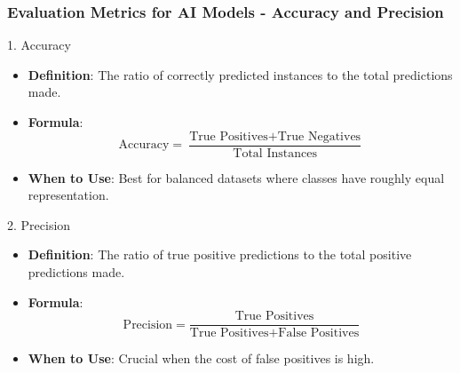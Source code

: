 \documentclass[aspectratio=169]{beamer}
\begin{document}
\begin{frame}[fragile]
    \frametitle{Evaluation Metrics for AI Models - Accuracy and Precision}
    \begin{block}{1. Accuracy}
        \begin{itemize}
            \item \textbf{Definition}: The ratio of correctly predicted instances to the total predictions made.
            \item \textbf{Formula}:  
            \begin{equation}
                \text{Accuracy} = \frac{\text{True Positives} + \text{True Negatives}}{\text{Total Instances}}
            \end{equation}
            \item \textbf{When to Use}: Best for balanced datasets where classes have roughly equal representation.
        \end{itemize}
    \end{block}

    \begin{block}{2. Precision}
        \begin{itemize}
            \item \textbf{Definition}: The ratio of true positive predictions to the total positive predictions made.
            \item \textbf{Formula}:  
            \begin{equation}
                \text{Precision} = \frac{\text{True Positives}}{\text{True Positives} + \text{False Positives}}
            \end{equation}
            \item \textbf{When to Use}: Crucial when the cost of false positives is high.
        \end{itemize}
    \end{block}
\end{frame}
\end{document}
